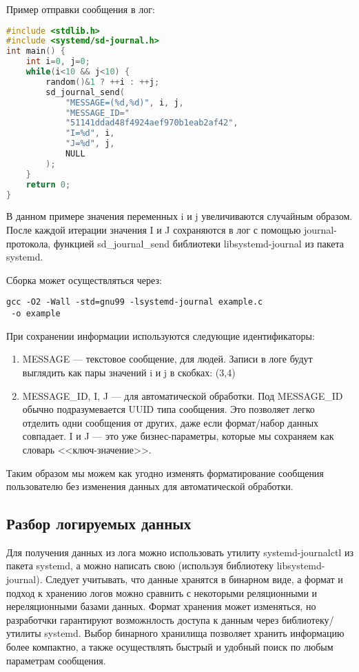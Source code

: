 \documentclass[10pt, a5paper]{article}
\begin{document}
Пример отправки сообщения в лог:

\begin{lstlisting}[language=C]
#include <stdlib.h>
#include <systemd/sd-journal.h>
int main() {
    int i=0, j=0;
    while(i<10 && j<10) {
        random()&1 ? ++i : ++j;
        sd_journal_send(
            "MESSAGE=(%d,%d)", i, j,
            "MESSAGE_ID="
            "51141ddad48f4924aef970b1eab2af42",
            "I=%d", i, 
            "J=%d", j,
            NULL
        );
    }
    return 0;
}
\end{lstlisting}
В данном примере значения переменных i и j увеличиваются случайным образом. После каждой итерации значения I и J сохраняются в лог с помощью journal-протокола, функцией sd\_journal\_send библиотеки libsystemd-journal из пакета systemd.

Сборка может осуществляться через:

\begin{verbatim}
gcc -O2 -Wall -std=gnu99 -lsystemd-journal example.c
 -o example
\end{verbatim}

При сохранении информации используются следующие идентификаторы:

\begin{enumerate}
  \item MESSAGE --- текстовое сообщение, для людей. Записи в логе будут выглядить как пары значений i и j в скобках: (3,4)
  \item MESSAGE\_ID, I, J --- для автоматической обработки. Под MESSAGE\_ID обычно подразумевается UUID типа сообщения. Это позволяет легко отделить одни сообщения от других, даже если формат/набор данных совпадает. I и J --- это уже бизнес-параметры, которые мы сохраняем как словарь <<ключ-значение>>.
\end{enumerate}

Таким образом мы можем как угодно изменять форматирование сообщения пользователю без изменения данных для автоматической обработки.

\subsection*{Разбор логируемых данных}

Для получения данных из лога можно использовать утилиту systemd-journalctl из пакета systemd, а можно написать свою (используя библиотеку libsystemd-journal). Следует учитывать, что данные хранятся в бинарном виде, а формат и подход к хранению логов можно сравнить с некоторыми реляционными и нереляционными базами данных. Формат хранения может изменяться, но разработчки гарантируют возможнлость доступа к данным через библиотеку/утилиты systemd. Выбор бинарного хранилища позволяет хранить информацию более компактно, а также осуществлять быстрый и удобный поиск по любым параметрам сообщения.
\end{document}
